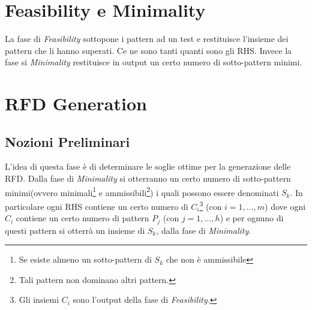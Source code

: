 
\section{Feasibility e Minimality}
La fase di \textit{Feasibility} sottopone i pattern ad un test e restituisce l'insieme dei pattern che li hanno superati. Ce ne sono tanti quanti sono gli RHS. Invece la fase si \textit{Minimality} restituisce in output un certo numero di sotto-pattern minimi.
\section{RFD Generation}
\subsection{Nozioni Preliminari}
L'idea di questa fase è di determinare le soglie ottime per la generazione delle RFD.
Dalla fase di \textit{Minimality} si otterranno un certo numero di sotto-pattern minimi(ovvero minimali\footnote{Se esiste almeno un sotto-pattern di $S_{k}$ che non è ammissibile} e ammissibili\footnote{Tali pattern non dominano altri pattern.}) i quali possono essere denominati $S_{k}$. In particolare ogni RHS contiene un certo numero di $C_{i}$\footnote{Gli insiemi $C_{i}$ sono l'output della fase di  \textit{Feasibility}.} (con $i=1,\dots,m$)  dove ogni $C_{i}$ contiene un certo numero di pattern $P_{j}$ (con $j = 1,\dots,h$) e per ognuno di questi pattern si otterrà un insieme di $S_{k}$, dalla fase di \textit{Minimality}.
